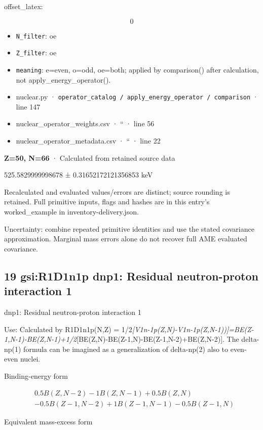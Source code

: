 \documentclass[
  11pt,
  letterpaper,
]{article}
\begin{document}
offset\_latex:

\[
0
\]

\begin{itemize}
\item
  \texttt{N\_filter}: oe
\item
  \texttt{Z\_filter}: oe
\item
  \texttt{meaning}: e=even, o=odd, oe=both; applied by comparison()
  after calculation, not apply\_energy\_operator().
\item
  nuclear.py ·
  \texttt{operator\_catalog\ /\ apply\_energy\_operator\ /\ comparison}
  · line 147
\item
  nuclear\_operator\_weights.csv · `` · line 56
\item
  nuclear\_operator\_metadata.csv · `` · line 22
\end{itemize}

\textbf{Z=50, N=66} · Calculated from retained source data

525.5829999998678 ± 0.31652172121356853 keV

Recalculated and evaluated values/errors are distinct; source rounding
is retained. Full primitive inputs, flags and hashes are in this entry's
worked\_example in inventory-delivery.json.

Uncertainty: combine repeated primitive identities and use the stated
covariance approximation. Marginal mass errors alone do not recover full
AME evaluated covariance.

\subsection{19 gsi:R1D1n1p dnp1: Residual neutron-proton interaction
1}\label{gsir1d1n1p-dnp1-residual-neutron-proton-interaction-1}

dnp1: Residual neutron-proton interaction 1

Use: Calculated by R1D1n1p(N,Z) =
1/2\emph{{[}V1n-1p(Z,N)-V1n-1p(Z,N-1)){]}=BE(Z-1,N-1)-BE(Z,N-1)+1/2}{[}BE(Z,N)-BE(Z-1,N)-BE(Z-1,N-2)+BE(Z,N-2){]}.
The delta-np(1) formula can be imagined as a generalization of
delta-np(2) also to even-even nuclei.

Binding-energy form

\[
\begin{aligned}
& 0.5B(Z,N-2)-1B(Z,N-1)+0.5B(Z,N) \\
& -0.5B(Z-1,N-2)+1B(Z-1,N-1)-0.5B(Z-1,N)
\end{aligned}
\]

Equivalent mass-excess form
\end{document}
